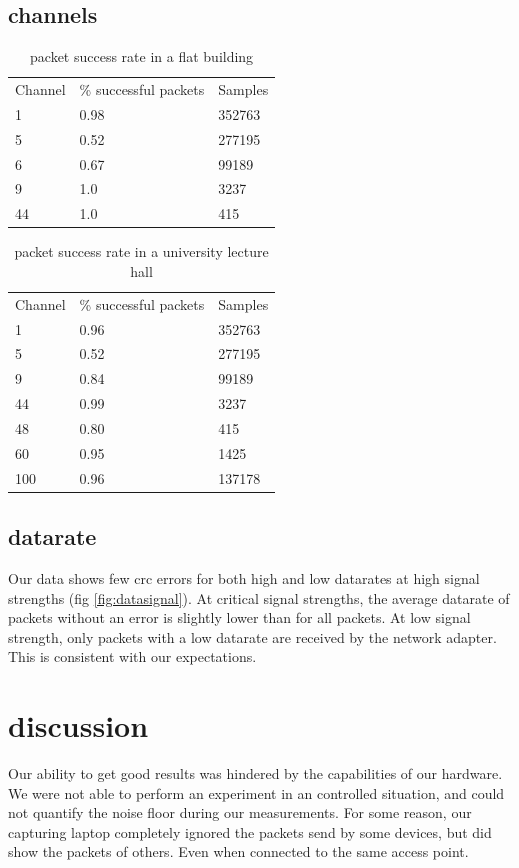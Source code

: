 \documentclass{IEEEtran}
\begin{document}
\subsection{channels}
\begin{table}[f]
\centering
\caption{packet success rate in a flat building}
\label{my-label}
\begin{tabular}{lll}
Channel & \% successful packets & Samples \\
1       & 0.98                          & 352763  \\
5       & 0.52                          & 277195  \\
6       & 0.67                          & 99189   \\
9       & 1.0                           & 3237    \\
44      & 1.0                           & 415    
\end{tabular}
\end{table}

\begin{table}[f]\centering
\caption{packet success rate in a university lecture hall}
\label{my-label}
\begin{tabular}{lll}
Channel & \% successful packets & Samples \\
1       & 0.96                          & 352763  \\
5       & 0.52                          & 277195  \\
9       & 0.84                          & 99189   \\
44      & 0.99                          & 3237   \\
48      & 0.80                          & 415    \\
60      & 0.95                          & 1425   \\
100     & 0.96                          & 137178 \\
\end{tabular}
\end{table}
\subsection{datarate}
Our data shows few crc errors for both high and low datarates at high signal strengths (fig \ref{fig:datasignal}). At critical signal strengths, the average datarate of packets without an error is slightly lower than for all packets. At low signal strength, only packets with a low datarate are received by the network adapter. This is consistent with our expectations.

\section{discussion}

Our ability to get good results was hindered by the capabilities of our hardware. We were not able to perform an experiment in an controlled situation, and could not quantify the noise floor during our measurements. For some reason, our capturing laptop completely ignored the packets send by some devices, but did show the packets of others. Even when connected to the same access point.


\clearpage
\printbibliography
\end{document}

